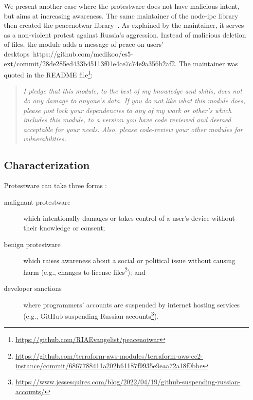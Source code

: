 \documentclass[journal,twocolumn]{IEEEtran}
\begin{document}
We present another case where the protestware does not have malicious intent, but aims at increasing awareness.
The same maintainer of the node-ipc library then created the peacenotwar library~\cite{Web:node-peacenotwar}.
As explained by the maintainer, it serves as a non-violent protest against Russia's aggression.
Instead of malicious deletion of files, the module adds a message of peace on users' desktops~https://github.com/medikoo/es5-ext/commit/28de285ed433b45113f01e4ce7c74e9a356b2af2.
The maintainer was quoted in the README file\footnote{\url{https://github.com/RIAEvangelist/peacenotwar}}:
\begin{quote}
    \textit{I pledge that this module, to the best of my knowledge and skills, does not do any damage to anyone's data. If you do not like what this module does, please just lock your dependencies to any of my work or other's which includes this module, to a version you have code reviewed and deemed acceptable for your needs. Also, please code-review your other modules for vulnerabilities.}
\end{quote}


\subsection{Characterization}
\label{sec:characterization}
Protestware can take three forms \cite{kula2022war}: 

\begin{description}
\item[malignant protestware] which intentionally damages or takes control of a user's device without their knowledge or consent; 
\item[benign protestware] which raises awareness about a social or political issue without causing harm (e.g., changes to license files\footnote{\url{https://github.com/terraform-aws-modules/terraform-aws-ec2-instance/commit/6867788411a202b61187f9935e9eaa72a18f0bbe}}); and 
\item[developer sanctions] where programmers' accounts are suspended by internet hosting services (e.g., GitHub suspending Russian accounts\footnote{\url{https://www.jessesquires.com/blog/2022/04/19/github-suspending-russian-accounts/}}). 
\end{description}
\end{document}
